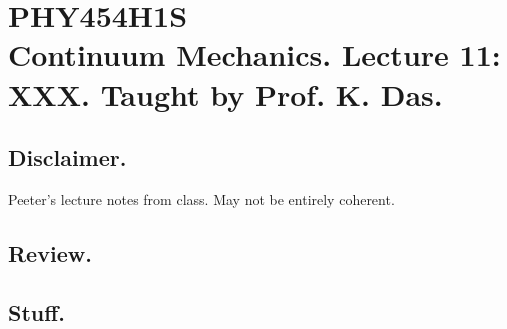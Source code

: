 
%

\chapter{PHY454H1S\\Continuum Mechanics.  Lecture 11: XXX.  Taught by Prof. K. Das.}
\label{chap:continuumL11}
{}
\date{Feb 15, 2012}

\beginArtWithToc

\section{Disclaimer.}

Peeter's lecture notes from class.  May not be entirely coherent.

\section{Review.}

\section{Stuff.}


\EndArticle
